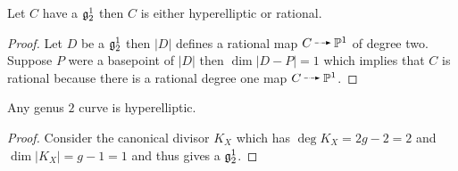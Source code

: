 \documentclass[12pt]{article}
\begin{document}
\begin{lemma}
Let $C$ have a $\mathfrak{g}^{1}_{2}$ then $C$ is either hyperelliptic or rational.
\end{lemma}

\begin{proof}
Let $D$ be a $\mathfrak{g}^{1}_{2}$ then $|D|$ defines a rational map $C \rat \P^1$ of degree two. Suppose $P$ were a basepoint of $|D|$ then $\dim |D - P| = 1$ which implies that $C$ is rational because there is a rational degree one map $C \rat \P^1$. 
\end{proof}

\begin{prop}
Any genus $2$ curve is hyperelliptic. 
\end{prop}

\begin{proof}
Consider the canonical divisor $K_X$ which has $\deg{K_X} = 2g - 2 = 2$ and $\dim{|K_X|} = g - 1 = 1$ and thus gives a $\mathfrak{g}^{1}_{2}$. 
\end{proof}
\end{document}
